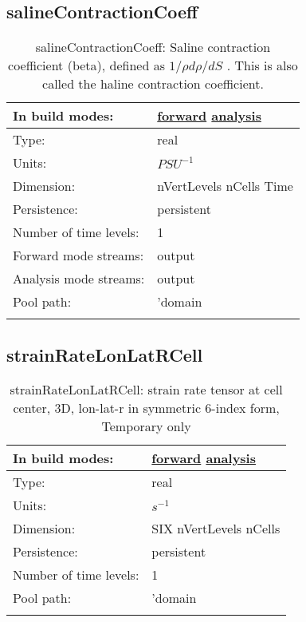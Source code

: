 \subsection[salineContractionCoeff]{salineContractionCoeff}
\label{subsec:var_sec_scratch_salineContractionCoeff}
\begin{center}
\begin{longtable}{| p{2.0in} | p{4.0in} |}
        \hline 
        In build modes: & \hyperref[subsec:forward_var_tab_scratch]{forward} \hyperref[subsec:analysis_var_tab_scratch]{analysis} \\
        \hline 
        Type: & real \\
        \hline 
        Units: & $PSU^{-1}$ \\
        \hline 
        Dimension: & nVertLevels nCells Time \\
        \hline 
        Persistence: & persistent \\
        \hline 
        Number of time levels: & 1 \\
        \hline 
		 Forward mode streams: &  output \\
        \hline 
		 Analysis mode streams: &  output \\
        \hline 
            Pool path: & 'domain %
 \\
		 \hline 
    \caption{salineContractionCoeff:  Saline contraction coefficient (beta), defined as  $1/\rho d\rho/dS$ .  This is also called the haline contraction coefficient.}
\end{longtable}
\end{center}
\subsection[strainRateLonLatRCell]{strainRateLonLatRCell}
\label{subsec:var_sec_scratch_strainRateLonLatRCell}
\begin{center}
\begin{longtable}{| p{2.0in} | p{4.0in} |}
        \hline 
        In build modes: & \hyperref[subsec:forward_var_tab_scratch]{forward} \hyperref[subsec:analysis_var_tab_scratch]{analysis} \\
        \hline 
        Type: & real \\
        \hline 
        Units: & $s^{-1}$ \\
        \hline 
        Dimension: & SIX nVertLevels nCells \\
        \hline 
        Persistence: & persistent \\
        \hline 
        Number of time levels: & 1 \\
        \hline 
            Pool path: & 'domain %
 \\
		 \hline 
    \caption{strainRateLonLatRCell: strain rate tensor at cell center, 3D, lon-lat-r in symmetric 6-index form, {\color{red}Temporary only}}
\end{longtable}
\end{center}
